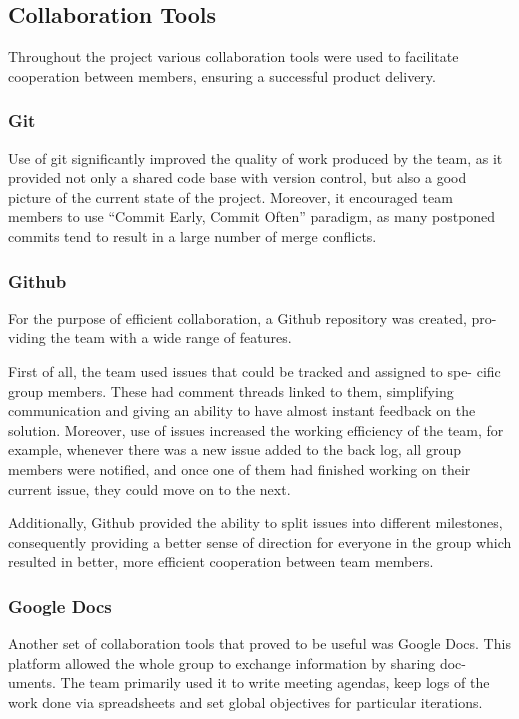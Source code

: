\documentclass[10pt]{report}
\begin{document}
\subsection{Collaboration Tools}

Throughout the project various collaboration tools were used to facilitate cooperation between members, ensuring a successful product delivery.

\subsubsection{Git}

Use of git significantly improved the quality of work produced by the team, as it provided not only a shared code base with version control, but also a good picture of the current state of the project. Moreover, it encouraged team members to use ``Commit Early, Commit Often'' paradigm, as many postponed commits tend to result in a large number of merge conflicts.

\subsubsection{Github}

For the purpose of efficient collaboration, a Github repository was created, pro-
viding the team with a wide range of features.

First of all, the team used issues that could be tracked and assigned to spe-
cific group members. These had comment threads linked to them, simplifying
communication and giving an ability to have almost instant feedback on the
solution. Moreover, use of issues increased the working efficiency of the team,
for example, whenever there was a new issue added to the back log, all group
members were notified, and once one of them had finished working on their
current issue, they could move on to the next.

Additionally, Github provided the ability to split issues into different milestones,
consequently providing a better sense of direction for everyone in the group
which resulted in better, more efficient cooperation between team members.

\subsubsection{Google Docs}

Another set of collaboration tools that proved to be useful was Google Docs.
This platform allowed the whole group to exchange information by sharing doc-
uments. The team primarily used it to write meeting agendas, keep logs of the
work done via spreadsheets and set global objectives for particular iterations.
\end{document}
